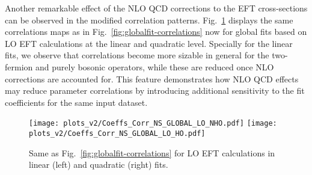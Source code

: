 Another remarkable effect of the  NLO QCD corrections
to the EFT cross-sections can be observed in the modified
correlation patterns.
%
Fig.~\ref{fig:Coeffs_Corr_260121-NS_GLOBAL_LO} displays
the same correlations maps as in Fig.~\ref{fig:globalfit-correlations} now
for global fits based
on LO EFT calculations at  the linear and quadratic level.
%
Specially for the linear fits, we observe that correlations
become more sizable in general
for the two-fermion and purely bosonic operators,
while these are
reduced once NLO corrections are accounted for.
%
This feature demonstrates how NLO QCD effects may reduce parameter correlations
by introducing additional sensitivity to the fit coefficients for the same input dataset.

\begin{figure}[t]
  \begin{center}
    \texttt{[image: plots\_v2/Coeffs\_Corr\_NS\_GLOBAL\_LO\_NHO.pdf]}
    \texttt{[image: plots\_v2/Coeffs\_Corr\_NS\_GLOBAL\_LO\_HO.pdf]}
     \caption{\small
       Same as Fig.~\ref{fig:globalfit-correlations} for
       LO EFT calculations in linear (left) and quadratic (right) fits.
      \label{fig:Coeffs_Corr_260121-NS_GLOBAL_LO} }
  \end{center}
\end{figure}
